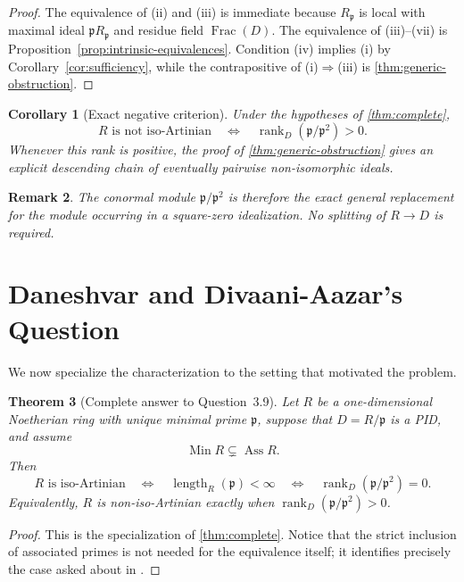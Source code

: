 \documentclass[11pt]{article}
\newtheorem{theorem}{Theorem}[section]
\newtheorem{corollary}[theorem]{Corollary}
\newtheorem{remark}[theorem]{Remark}
\theoremstyle{definition}
\newcommand{\Ass}{\operatorname{Ass}}
\newcommand{\Min}{\operatorname{Min}}
\newcommand{\rank}{\operatorname{rank}}
\newcommand{\len}{\operatorname{length}}
\newcommand{\Frac}{\operatorname{Frac}}
\begin{document}
\begin{proof}
The equivalence of (ii) and (iii) is immediate because $R_{\mathfrak p}$ is local with maximal
ideal $\mathfrak pR_{\mathfrak p}$ and residue field $\Frac(D)$.  The equivalence of
(iii)--(vii) is Proposition~\ref{prop:intrinsic-equivalences}.  Condition (iv) implies (i) by
Corollary~\ref{cor:sufficiency}, while the contrapositive of (i)$\Rightarrow$(iii) is
\cref{thm:generic-obstruction}.
\end{proof}

\begin{corollary}[Exact negative criterion]\label{cor:negative}
Under the hypotheses of \cref{thm:complete},
\[
 R\text{ is not iso-Artinian}
 \quad\Longleftrightarrow\quad
 \rank_D(\mathfrak p/\mathfrak p^2)>0.
\]
Whenever this rank is positive, the proof of \cref{thm:generic-obstruction} gives an explicit
descending chain of eventually pairwise non-isomorphic ideals.
\end{corollary}

\begin{remark}\label{rem:conormal}
The conormal module $\mathfrak p/\mathfrak p^2$ is therefore the exact general replacement for
the module occurring in a square-zero idealization.  No splitting of $R\to D$ is required.
\end{remark}

\section{Daneshvar and Divaani-Aazar's Question}

We now specialize the characterization to the setting that motivated the problem.

\begin{theorem}[Complete answer to Question~3.9]\label{thm:q39}
Let $R$ be a one-dimensional Noetherian ring with unique minimal prime $\mathfrak p$, suppose
that $D=R/\mathfrak p$ is a PID, and assume
\[
 \Min R\subsetneq\Ass R.
\]
Then
\[
 R\text{ is iso-Artinian}
 \quad\Longleftrightarrow\quad
 \len_R(\mathfrak p)<\infty
 \quad\Longleftrightarrow\quad
 \rank_D(\mathfrak p/\mathfrak p^2)=0.
\]
Equivalently, $R$ is non-iso-Artinian exactly when
$\rank_D(\mathfrak p/\mathfrak p^2)>0$.
\end{theorem}

\begin{proof}
This is the specialization of \cref{thm:complete}.  Notice that the strict inclusion of
associated primes is not needed for the equivalence itself; it identifies precisely the case
asked about in \cite[Question~3.9]{DaneshvarDivaaniAazar2025}.
\end{proof}
\end{document}
